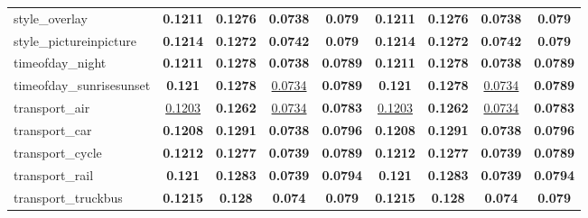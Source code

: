 \begin{center}
\begin{supertabular}{lcccc||cccc}
\small{style\_overlay} & \textbf{\scriptsize{0.1211}} & \textbf{\scriptsize{0.1276}} & \textbf{\scriptsize{0.0738}} & \textbf{\scriptsize{0.079}}& \textbf{\scriptsize{0.1211}} & \textbf{\scriptsize{0.1276}} & \textbf{\scriptsize{0.0738}} & \textbf{\scriptsize{0.079}}\\
\small{style\_pictureinpicture} & \textbf{\scriptsize{0.1214}} & \textbf{\scriptsize{0.1272}} & \textbf{\scriptsize{0.0742}} & \textbf{\scriptsize{0.079}}& \textbf{\scriptsize{0.1214}} & \textbf{\scriptsize{0.1272}} & \textbf{\scriptsize{0.0742}} & \textbf{\scriptsize{0.079}}\\
\small{timeofday\_night} & \textbf{\scriptsize{0.1211}} & \textbf{\scriptsize{0.1278}} & \textbf{\scriptsize{0.0738}} & \textbf{\scriptsize{0.0789}}& \textbf{\scriptsize{0.1211}} & \textbf{\scriptsize{0.1278}} & \textbf{\scriptsize{0.0738}} & \textbf{\scriptsize{0.0789}}\\
\small{timeofday\_sunrisesunset} & \textbf{\scriptsize{0.121}} & \textbf{\scriptsize{0.1278}} & \underline{\scriptsize{0.0734}} & \textbf{\scriptsize{0.0789}}& \textbf{\scriptsize{0.121}} & \textbf{\scriptsize{0.1278}} & \underline{\scriptsize{0.0734}} & \textbf{\scriptsize{0.0789}}\\
\small{transport\_air} & \underline{\scriptsize{0.1203}} & \textbf{\scriptsize{0.1262}} & \underline{\scriptsize{0.0734}} & \textbf{\scriptsize{0.0783}}& \underline{\scriptsize{0.1203}} & \textbf{\scriptsize{0.1262}} & \underline{\scriptsize{0.0734}} & \textbf{\scriptsize{0.0783}}\\
\small{transport\_car} & \textbf{\scriptsize{0.1208}} & \textbf{\scriptsize{0.1291}} & \textbf{\scriptsize{0.0738}} & \textbf{\scriptsize{0.0796}}& \textbf{\scriptsize{0.1208}} & \textbf{\scriptsize{0.1291}} & \textbf{\scriptsize{0.0738}} & \textbf{\scriptsize{0.0796}}\\
\small{transport\_cycle} & \textbf{\scriptsize{0.1212}} & \textbf{\scriptsize{0.1277}} & \textbf{\scriptsize{0.0739}} & \textbf{\scriptsize{0.0789}}& \textbf{\scriptsize{0.1212}} & \textbf{\scriptsize{0.1277}} & \textbf{\scriptsize{0.0739}} & \textbf{\scriptsize{0.0789}}\\
\small{transport\_rail} & \textbf{\scriptsize{0.121}} & \textbf{\scriptsize{0.1283}} & \textbf{\scriptsize{0.0739}} & \textbf{\scriptsize{0.0794}}& \textbf{\scriptsize{0.121}} & \textbf{\scriptsize{0.1283}} & \textbf{\scriptsize{0.0739}} & \textbf{\scriptsize{0.0794}}\\
\small{transport\_truckbus} & \textbf{\scriptsize{0.1215}} & \textbf{\scriptsize{0.128}} & \textbf{\scriptsize{0.074}} & \textbf{\scriptsize{0.079}}& \textbf{\scriptsize{0.1215}} & \textbf{\scriptsize{0.128}} & \textbf{\scriptsize{0.074}} & \textbf{\scriptsize{0.079}}\\

\end{supertabular}
\end{center}
